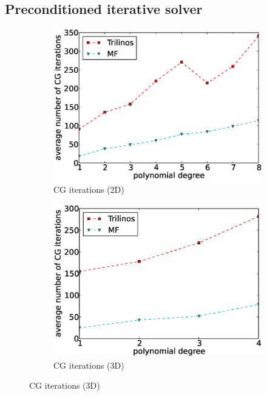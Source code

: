 \documentclass[AMA,STIX1COL]{WileyNJD-v2}
\begin{document}
\subsection{Preconditioned iterative solver}

\begin{figure}[!ht]
  \begin{subfigure}[b]{0.49\textwidth}
    \centering
    \includegraphics[width=\textwidth]{CSL_Munich_cg2d.eps}
    \caption{CG iterations (2D)}
    \label{fig:benchmark_miehe_Emmy_cg2}
  \end{subfigure}
  \begin{subfigure}[b]{0.49\textwidth}
    \centering
    \includegraphics[width=\textwidth]{CSL_Munich_cg3d.eps}
    \caption{CG iterations (3D)}
    \label{fig:benchmark_miehe_Emmy_cg3}

\end{subfigure}
\end{figure}
\end{document}
